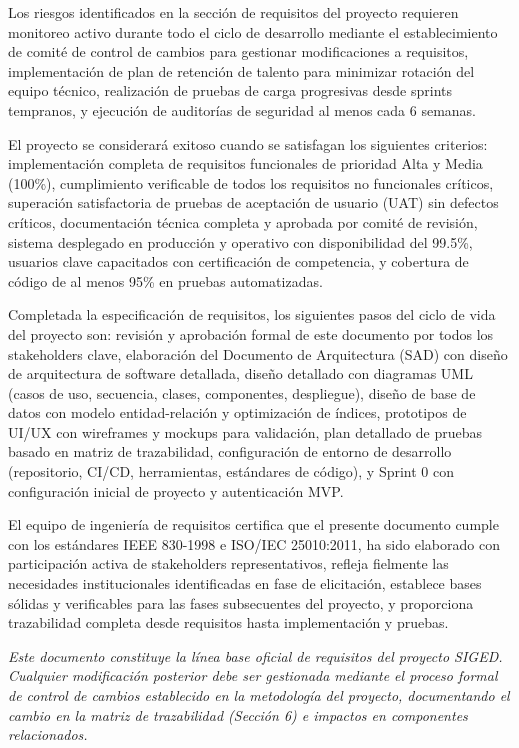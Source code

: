 \documentclass[12pt,a4paper]{article}
\begin{document}
Los riesgos identificados en la sección de requisitos del proyecto requieren monitoreo activo durante todo el ciclo de desarrollo mediante el establecimiento de comité de control de cambios para gestionar modificaciones a requisitos, implementación de plan de retención de talento para minimizar rotación del equipo técnico, realización de pruebas de carga progresivas desde sprints tempranos, y ejecución de auditorías de seguridad al menos cada 6 semanas.

El proyecto se considerará exitoso cuando se satisfagan los siguientes criterios: implementación completa de requisitos funcionales de prioridad Alta y Media (100\%), cumplimiento verificable de todos los requisitos no funcionales críticos, superación satisfactoria de pruebas de aceptación de usuario (UAT) sin defectos críticos, documentación técnica completa y aprobada por comité de revisión, sistema desplegado en producción y operativo con disponibilidad del 99.5\%, usuarios clave capacitados con certificación de competencia, y cobertura de código de al menos 95\% en pruebas automatizadas.

Completada la especificación de requisitos, los siguientes pasos del ciclo de vida del proyecto son: revisión y aprobación formal de este documento por todos los stakeholders clave, elaboración del Documento de Arquitectura (SAD) con diseño de arquitectura de software detallada, diseño detallado con diagramas UML (casos de uso, secuencia, clases, componentes, despliegue), diseño de base de datos con modelo entidad-relación y optimización de índices, prototipos de UI/UX con wireframes y mockups para validación, plan detallado de pruebas basado en matriz de trazabilidad, configuración de entorno de desarrollo (repositorio, CI/CD, herramientas, estándares de código), y Sprint 0 con configuración inicial de proyecto y autenticación MVP.

El equipo de ingeniería de requisitos certifica que el presente documento cumple con los estándares IEEE 830-1998 e ISO/IEC 25010:2011, ha sido elaborado con participación activa de stakeholders representativos, refleja fielmente las necesidades institucionales identificadas en fase de elicitación, establece bases sólidas y verificables para las fases subsecuentes del proyecto, y proporciona trazabilidad completa desde requisitos hasta implementación y pruebas.

\vspace{1cm}

\textit{Este documento constituye la línea base oficial de requisitos del proyecto SIGED. Cualquier modificación posterior debe ser gestionada mediante el proceso formal de control de cambios establecido en la metodología del proyecto, documentando el cambio en la matriz de trazabilidad (Sección 6) e impactos en componentes relacionados.}
\end{document}
